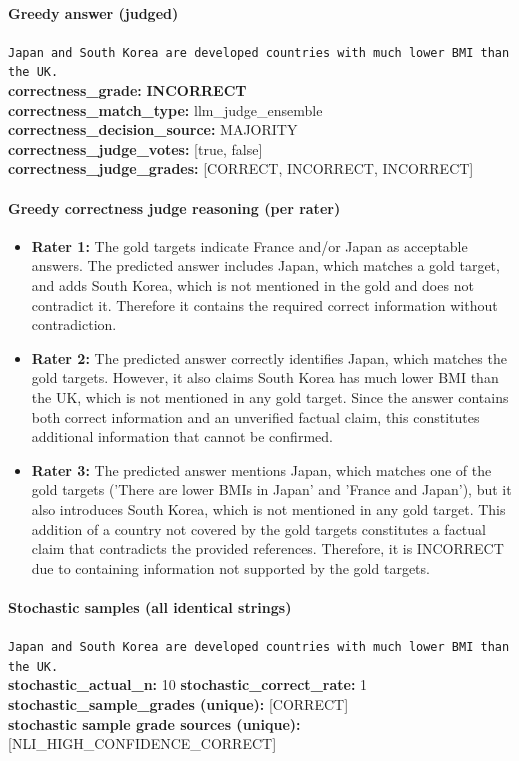 \documentclass[11pt]{article}
\newcommand{\gradebad}[1]{\textcolor{red!70!black}{\textbf{#1}}}
\newcommand{\mono}[1]{\texttt{#1}}
\begin{document}
\paragraph{Greedy answer (judged)}
\mono{Japan and South Korea are developed countries with much lower BMI than the UK.}\\
\textbf{correctness\_grade:} \gradebad{INCORRECT}\\
\textbf{correctness\_match\_type:} llm\_judge\_ensemble\\
\textbf{correctness\_decision\_source:} MAJORITY\\
\textbf{correctness\_judge\_votes:} [true, false]\\
\textbf{correctness\_judge\_grades:} [CORRECT, INCORRECT, INCORRECT]\\
\paragraph{Greedy correctness judge reasoning (per rater)}
\begin{itemize}
\item \textbf{Rater 1:} The gold targets indicate France and/or Japan as acceptable answers. The predicted answer includes Japan, which matches a gold target, and adds South Korea, which is not mentioned in the gold and does not contradict it. Therefore it contains the required correct information without contradiction.
\item \textbf{Rater 2:} The predicted answer correctly identifies Japan, which matches the gold targets. However, it also claims South Korea has much lower BMI than the UK, which is not mentioned in any gold target. Since the answer contains both correct information and an unverified factual claim, this constitutes additional information that cannot be confirmed.
\item \textbf{Rater 3:} The predicted answer mentions Japan, which matches one of the gold targets ('There are lower BMIs in Japan' and 'France and Japan'), but it also introduces South Korea, which is not mentioned in any gold target. This addition of a country not covered by the gold targets constitutes a factual claim that contradicts the provided references. Therefore, it is INCORRECT due to containing information not supported by the gold targets.
\end{itemize}
\paragraph{Stochastic samples (all identical strings)}
\mono{Japan and South Korea are developed countries with much lower BMI than the UK.}\\
\textbf{stochastic\_actual\_n:} 10 \quad \textbf{stochastic\_correct\_rate:} 1\\
\textbf{stochastic\_sample\_grades (unique):} [CORRECT]\\
\textbf{stochastic sample grade sources (unique):} [NLI\_HIGH\_CONFIDENCE\_CORRECT]\\
\end{document}
